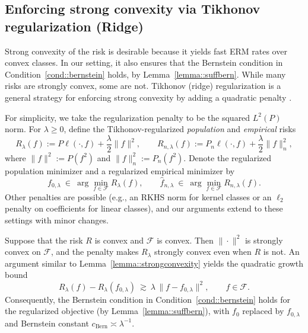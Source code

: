\documentclass[11pt]{article}
\theoremstyle{plain}
\theoremstyle{definition} %
\begin{document}
 

 
\subsection{Enforcing strong convexity via Tikhonov regularization (Ridge)}

 
 
 \label{appendix::regularridge}
Strong convexity of the risk is desirable because it yields fast ERM rates over convex classes. In
our setting, it also ensures that the Bernstein condition in Condition~\ref{cond::bernstein} holds, by
Lemma~\ref{lemma::suffbern}. While many risks are strongly convex, some are not. Tikhonov (ridge)
regularization is a general strategy for enforcing strong convexity by adding a quadratic penalty \citep{hoerl1970ridge, tihonov1977solutions}.
 


For simplicity, we take the regularization penalty to be the squared $L^2(P)$ norm. For $\lambda\ge 0$,
define the Tikhonov-regularized \emph{population} and \emph{empirical} risks
\[
R_\lambda(f)
:=
P\ell(\cdot,f)+\frac{\lambda}{2}\|f\|^2,
\qquad
R_{n,\lambda}(f)
:=
P_n\ell(\cdot,f)+\frac{\lambda}{2}\|f\|_n^2,
\]
where $\|f\|^2 := P(f^2)$ and $\|f\|_n^2 := P_n(f^2)$. Denote the regularized population minimizer and a regularized empirical minimizer by
\[
f_{0,\lambda}\ \in\ \arg\min_{f\in\mathcal F} R_\lambda(f),
\qquad
\hat f_{n,\lambda}\ \in\ \arg\min_{f\in\mathcal F} R_{n,\lambda}(f).
\]
Other penalties are possible (e.g., an RKHS norm for kernel classes or an $\ell_2$ penalty on
coefficients for linear classes), and our arguments extend to these settings with minor
changes.
 



Suppose that the risk $R$ is convex and $\mathcal{F}$ is convex. Then $\|\cdot\|^2$ is strongly convex
on $\mathcal F$, and the penalty makes $R_\lambda$ strongly convex even when $R$ is not. An argument
similar to Lemma~\ref{lemma::strongconvexity} yields the quadratic growth bound
\[
R_\lambda(f)-R_\lambda(f_{0,\lambda})
\ \gtrsim\
\lambda\,\|f-f_{0,\lambda}\|^2,
\qquad f\in\mathcal F.
\]
Consequently, the Bernstein condition in Condition~\ref{cond::bernstein} holds for the regularized
objective (by Lemma~\ref{lemma::suffbern}), with $f_0$ replaced by $f_{0,\lambda}$ and Bernstein
constant $c_{\mathrm{Bern}} \asymp \lambda^{-1}$.
\end{document}
